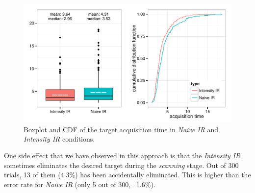 \begin{figure}[t]
\centering
\includegraphics[width=1.0\columnwidth]{figures/result_study2.pdf}
\caption{Boxplot and CDF of the target acquisition time in {\em Naive IR} and {\em Intensity IR} conditions.}
\label{fig:study2}
\end{figure}

One side effect that we have observed in this approach is that the {\em Intensity IR} sometimes eliminates the desired target during the {\em scanning} stage. Out of 300 trials, 13 of them (4.3\%) has been accidentally eliminated. This is higher than the error rate for {\em Naive IR} (only 5 out of 300, ~1.6\%). %

